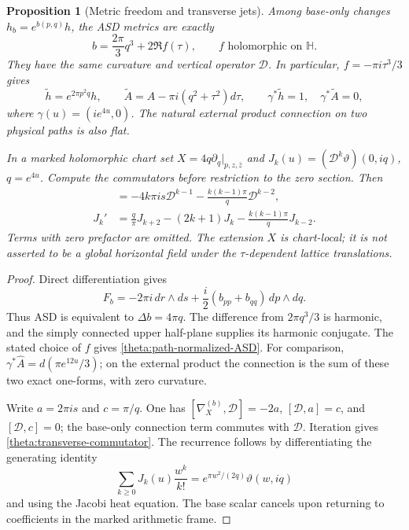 \documentclass[11pt]{article}
\numberwithin{equation}{section}
\newtheorem{proposition}[theorem]{Proposition}
\theoremstyle{definition}
\theoremstyle{remark}
\begin{document}
\begin{proposition}[Metric freedom and transverse jets]
\label{theta:metric-freedom}
Among base-only changes $h_b=e^{b(p,q)}h$, the ASD metrics are exactly
\begin{equation}
 b=\frac{2\pi}{3}q^3+2\Re f(\tau),\qquad
 f\text{ holomorphic on }\mathbb H.
 \label{theta:ASD-classification}
\end{equation}
They have the same curvature and vertical operator $\mathcal D$.
In particular, $f=-\pi i\tau^3/3$ gives
\begin{equation}
 \widetilde h=e^{2\pi p^2q}h,\qquad
 \widetilde A=A-\pi i(q^2+\tau^2)d\tau,
 \qquad\gamma^*\widetilde h=1,\quad\gamma^*\widetilde A=0,
 \label{theta:path-normalized-ASD}
\end{equation}
where $\gamma(u)=(ie^{4u},0)$.  The natural external product connection
on two physical paths is also flat.

In a marked holomorphic chart set
$X=4q\partial_q|_{p,z,\bar z}$ and
$J_k(u)=(\mathcal D^k\vartheta)(0,iq)$, $q=e^{4u}$.  Compute the
commutators before restriction to the zero section.  Then
\begin{align}
 [\nabla_X^{(b)},\mathcal D^k]
 &=-4k\pi i s\mathcal D^{k-1}
   -\frac{k(k-1)\pi}{q}\mathcal D^{k-2},
 \label{theta:transverse-commutator}\\
 J_k'&=\frac q\pi J_{k+2}-(2k+1)J_k
       -\frac{k(k-1)\pi}{q}J_{k-2}.
 \label{theta:covariant-jet-recurrence}
\end{align}
Terms with zero prefactor are omitted.  The extension $X$ is chart-local;
it is not asserted to be a global horizontal field under the
$\tau$-dependent lattice translations.
\end{proposition}
\begin{proof}
Direct differentiation gives
\[
 F_b=-2\pi i\,dr\wedge ds
       +\frac i2(b_{pp}+b_{qq})\,dp\wedge dq.
\]
Thus ASD is equivalent to $\Delta b=4\pi q$.  The difference from
$2\pi q^3/3$ is harmonic, and the simply connected upper half-plane
supplies its harmonic conjugate.  The stated choice of $f$ gives
\eqref{theta:path-normalized-ASD}.  For comparison,
$\gamma^*\widehat A=d(\pi e^{12u}/3)$; on the external product the
connection is the sum of these two exact one-forms, with zero curvature.

Write $a=2\pi i s$ and $c=\pi/q$.  One has
$[\nabla_X^{(b)},\mathcal D]=-2a$,
$[\mathcal D,a]=c$, and $[\mathcal D,c]=0$; the base-only connection
term commutes with $\mathcal D$.  Iteration gives
\eqref{theta:transverse-commutator}.  The recurrence follows by
differentiating the generating identity
\[
 \sum_{k\ge0}J_k(u)\frac{w^k}{k!}
   =e^{\pi w^2/(2q)}\vartheta(w,iq)
\]
and using the Jacobi heat equation.  The base scalar cancels upon
returning to coefficients in the marked arithmetic frame.
\end{proof}
\end{document}
